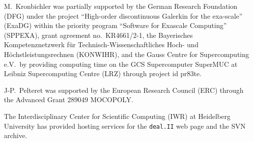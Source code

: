 \documentclass{ansarticle-preprint}
\newcommand{\specialword}[1]{\texttt{#1}}
\newcommand{\dealii}{{\specialword{deal.II}}}
\begin{document}
M.~Kronbichler was partially supported by the German Research Foundation (DFG)
under the project ``High-order discontinuous Galerkin for the exa-scale''
(ExaDG) within the priority program ``Software for Exascale Computing''
(SPPEXA), grant agreement no.~KR4661/2-1, the Bayerisches Kompetenznetzwerk
f\"ur Technisch-Wissenschaftliches Hoch- und H\"ochstleistungsrechnen
(KONWIHR), and the Gauss Centre for Supercomputing e.V.~by providing computing
time on the GCS Supercomputer SuperMUC at Leibniz Supercomputing Centre (LRZ)
through project id pr83te.

J-P.~Pelteret was supported by the European Research Council (ERC) through the Advanced Grant 289049 MOCOPOLY.

The Interdisciplinary Center for Scientific Computing (IWR) at Heidelberg University has provided
hosting services for the \dealii{} web page and the SVN archive.


{}

\end{document}
